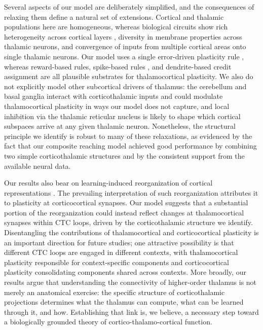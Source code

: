 \documentclass[11pt]{article}
\begin{document}
Several aspects of our model are deliberately simplified, and the
consequences of relaxing them define a natural set of extensions.
Cortical and thalamic populations here are homogeneous, whereas
biological circuits show rich heterogeneity across cortical layers
\cite{economo2018distinct, guo2018anterolateral}, diversity in
membrane properties across thalamic neurons, and convergence of inputs
from multiple cortical areas onto single thalamic neurons. Our model
uses a single error-driven plasticity rule \cite{murray2019local},
whereas reward-based rules, spike-based rules
\cite{gilra2017predicting}, and dendrite-based credit assignment
\cite{guerguiev2017towards, bittner2017behavioral} are all plausible
substrates for thalamocortical plasticity. We also do not explicitly
model other subcortical drivers of thalamus: the cerebellum and basal
ganglia interact with corticothalamic inputs and could modulate
thalamocortical plasticity in ways our model does not capture, and
local inhibition via the thalamic reticular nucleus is likely to shape
which cortical subspaces arrive at any given thalamic neuron.
Nonetheless, the structural principle we identify is robust to many of
these relaxations, as evidenced by the fact that our composite
reaching model achieved good performance by combining two simple
corticothalamic structures and by the consistent support from the
available neural data.

Our results also bear on learning-induced reorganization of cortical
representations \cite{peters2014emergence, mante2013context}. The
prevailing interpretation of such reorganization attributes it to
plasticity at corticocortical synapses. Our model suggests that a
substantial portion of the reorganization could instead reflect
changes at thalamocortical synapses within CTC loops, driven by the
corticothalamic structure we identify. Disentangling the contributions
of thalamocortical and corticocortical plasticity is an important
direction for future studies; one attractive possibility is that
different CTC loops are engaged in different contexts, with
thalamocortical plasticity responsible for context-specific components
and corticocortical plasticity consolidating components shared across
contexts. More broadly, our results argue that understanding the
connectivity of higher-order thalamus is not merely an anatomical
exercise: the specific structure of corticothalamic projections
determines what the thalamus can compute, what can be learned through
it, and how. Establishing that link is, we believe, a necessary step
toward a biologically grounded theory of cortico-thalamo-cortical
function.



\end{document}
